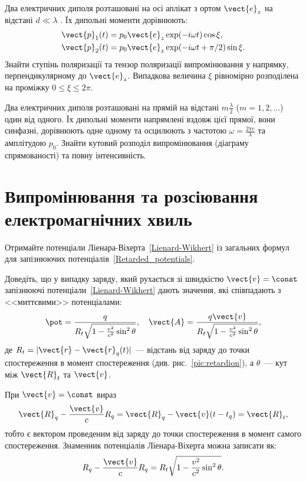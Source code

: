 \begin{problem}
Два електричних диполя розташовані на осі аплікат з ортом $\vect{e}_z$  на відстані $d \ll \lambda$ . Їх дипольні моменти дорівнюють:
\begin{align*}
	\vect{p}_1(t) & = p_0\vect{e}_z\exp(-i\omega t)\cos\xi,        \\
	\vect{p}_2(t) & = p_0\vect{e}_z\exp(-i\omega t +\pi/2)\sin\xi.
\end{align*}
Знайти ступінь поляризації та тензор поляризації випромінювання у напрямку, перпендикулярному до $\vect{e}_z$. Випадкова величина $\xi$ рівномірно розподілена на проміжку $0 \le \xi \le 2\pi$.
\end{problem}

\begin{problem}
Два електричних диполя розташовані на прямій на відстані $m\frac\lambda2$ ($m = 1,2, \ldots$) один від одного. Їх дипольні моменти напрямлені вздовж цієї прямої, вони синфазні, дорівнюють одне одному та осцилюють з частотою $\omega = \frac{2\pi c}{\lambda}$ та амплітудою $p_0$. Знайти кутовий розподіл випромінювання (діаграму спрямованості) та повну інтенсивність.
\end{problem}


\section{Випромінювання та розсіювання електромагнічних хвиль}


\begin{problem}
Отримайте потенціали Ліенара-Віхерта~\eqref{Lienard-Wikhert} із загальних формул для запізнюючих потенціалів~\eqref{Retarded_potentials}.
\end{problem}


\begin{problem}
Доведіть, що у випадку заряду, який рухається зі швидкістю $\vect{v} = \const$ запізнюючі потенціали~\eqref{Lienard-Wikhert} дають значення, які співпадають з <<миттєвими>> потенціалами:
\[
	\pot =  \frac{q}{R_t\sqrt{1-\frac{v^2}{c^2}\sin^2\theta}}, \quad
	\vect{A} =\frac{q\vect{v}}{R_t\sqrt{1-\frac{v^2}{c^2}\sin^2\theta}},
\]
де $R_t = |\vect{r} - \vect{r}_q(t)|$~--- відстань від заряду до точки спостереження в момент спостереження (див. рис.~\ref{pic:retardion}), а $\theta$~--- кут між $\vect{R}_t$ та $\vect{v}$.
\begin{solution}
	При $\vect{v} = \const$  вираз
	\[
		\vect{R}_q - \frac{\vect{v}}{c} R_q = \vect{R}_q -\vect{v}(t - t_q) = \vect{R}_t,
	\]
	тобто є вектором проведеним від заряду до точки спостереження в момент самого спостереження.
	Знаменник потенціалів Ліенара-Віхерта можна записати як:
	\[
		R_q - \frac{\vect{v}}{c} R_q = R_t\sqrt{1-\frac{v^2}{c^2}\sin^2\theta}.
	\]
\end{solution}
\end{problem}


